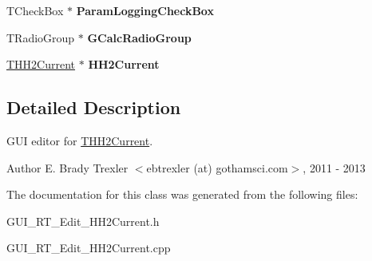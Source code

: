 \begin{DoxyCompactItemize}
\item 
\hypertarget{class_t_h_h2_current_form_ac1f9b10751b34cc4d15288036dd0f262}{T\+Check\+Box $\ast$ {\bfseries Param\+Logging\+Check\+Box}}\label{class_t_h_h2_current_form_ac1f9b10751b34cc4d15288036dd0f262}

\item 
\hypertarget{class_t_h_h2_current_form_a9bf48934be5f6a9c73ded52bdeeb72f6}{T\+Radio\+Group $\ast$ {\bfseries G\+Calc\+Radio\+Group}}\label{class_t_h_h2_current_form_a9bf48934be5f6a9c73ded52bdeeb72f6}

\item 
\hypertarget{class_t_h_h2_current_form_ad80ad357fb2289fe24d4921fd148e6f4}{\hyperlink{class_t_h_h2_current}{T\+H\+H2\+Current} $\ast$ {\bfseries H\+H2\+Current}}\label{class_t_h_h2_current_form_ad80ad357fb2289fe24d4921fd148e6f4}

\end{DoxyCompactItemize}


\subsection{Detailed Description}
G\+U\+I editor for \hyperlink{class_t_h_h2_current}{T\+H\+H2\+Current}. 

\begin{DoxyAuthor}{Author}
E. Brady Trexler $<$ebtrexler (at) gothamsci.\+com$>$, 2011 -\/ 2013 
\end{DoxyAuthor}


The documentation for this class was generated from the following files\+:\begin{DoxyCompactItemize}
\item 
G\+U\+I\+\_\+\+R\+T\+\_\+\+Edit\+\_\+\+H\+H2\+Current.\+h\item 
G\+U\+I\+\_\+\+R\+T\+\_\+\+Edit\+\_\+\+H\+H2\+Current.\+cpp\end{DoxyCompactItemize}
